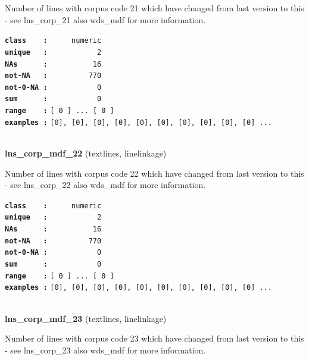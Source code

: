 \documentclass[]{article}
\begin{document}
Number of lines with corpus code 21 which have changed from last version
to this - see lns\_corp\_21 also wds\_mdf for more information.

\textbf{\texttt{class\ \ \ \ :}} \texttt{~~~~~numeric}\\
\textbf{\texttt{unique\ \ \ :}} \texttt{~~~~~~~~~~~2}\\
\textbf{\texttt{NAs\ \ \ \ \ \ :}} \texttt{~~~~~~~~~~16}\\
\textbf{\texttt{not-NA\ \ \ :}} \texttt{~~~~~~~~~770}\\
\textbf{\texttt{not-0-NA\ :}} \texttt{~~~~~~~~~~~0}\\
\textbf{\texttt{sum\ \ \ \ \ \ :}} \texttt{~~~~~~~~~~~0}\\
\textbf{\texttt{range\ \ \ \ :}}
\texttt{{[}\ 0\ {]}\ ...\ {[}\ 0\ {]}}\\
\textbf{\texttt{examples\ :}}
\texttt{{[}0{]},\ {[}0{]},\ {[}0{]},\ {[}0{]},\ {[}0{]},\ {[}0{]},\ {[}0{]},\ {[}0{]},\ {[}0{]},\ {[}0{]}\ ...}\\

~

\textbf{lns\_corp\_mdf\_22} (textlines, linelinkage)

Number of lines with corpus code 22 which have changed from last version
to this - see lns\_corp\_22 also wds\_mdf for more information.

\textbf{\texttt{class\ \ \ \ :}} \texttt{~~~~~numeric}\\
\textbf{\texttt{unique\ \ \ :}} \texttt{~~~~~~~~~~~2}\\
\textbf{\texttt{NAs\ \ \ \ \ \ :}} \texttt{~~~~~~~~~~16}\\
\textbf{\texttt{not-NA\ \ \ :}} \texttt{~~~~~~~~~770}\\
\textbf{\texttt{not-0-NA\ :}} \texttt{~~~~~~~~~~~0}\\
\textbf{\texttt{sum\ \ \ \ \ \ :}} \texttt{~~~~~~~~~~~0}\\
\textbf{\texttt{range\ \ \ \ :}}
\texttt{{[}\ 0\ {]}\ ...\ {[}\ 0\ {]}}\\
\textbf{\texttt{examples\ :}}
\texttt{{[}0{]},\ {[}0{]},\ {[}0{]},\ {[}0{]},\ {[}0{]},\ {[}0{]},\ {[}0{]},\ {[}0{]},\ {[}0{]},\ {[}0{]}\ ...}\\

~

\textbf{lns\_corp\_mdf\_23} (textlines, linelinkage)

Number of lines with corpus code 23 which have changed from last version
to this - see lns\_corp\_23 also wds\_mdf for more information.
\end{document}
